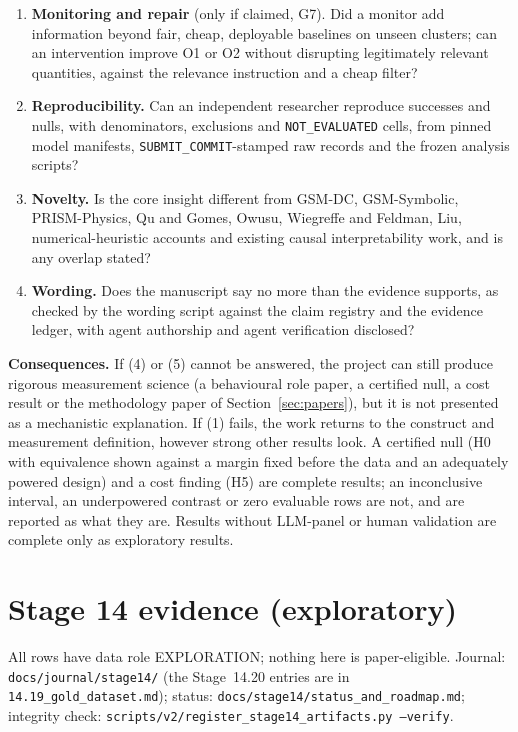 \documentclass[10pt,a4paper]{article}
\newcommand{\NE}{\texttt{NOT\_EVALUATED}}
\begin{document}
\begin{enumerate}
which models were uninformative because they fell outside the difficulty band?
\item \textbf{Monitoring and repair} (only if claimed, G7). Did a monitor add information beyond fair, cheap,
deployable baselines on unseen clusters; can an intervention improve O1 or O2 without disrupting legitimately
relevant quantities, against the relevance instruction and a cheap filter?
\item \textbf{Reproducibility.} Can an independent researcher reproduce successes and nulls, with denominators,
exclusions and \NE{} cells, from pinned model manifests, \texttt{SUBMIT\_COMMIT}-stamped raw records and the frozen
analysis scripts?
\item \textbf{Novelty.} Is the core insight different from GSM-DC, GSM-Symbolic, PRISM-Physics, Qu and Gomes,
Owusu, Wiegreffe and Feldman, Liu, numerical-heuristic accounts and existing causal interpretability work, and is
any overlap stated?
\item \textbf{Wording.} Does the manuscript say no more than the evidence supports, as checked by the wording
script against the claim registry and the evidence ledger, with agent authorship and agent verification
disclosed?
\end{enumerate}

\textbf{Consequences.} If (4) or (5) cannot be answered, the project can still produce rigorous measurement
science (a behavioural role paper, a certified null, a cost result or the methodology paper of
Section~\ref{sec:papers}), but it is not presented as a mechanistic explanation. If (1) fails, the work returns to
the construct and measurement definition, however strong other results look. A certified null (H0 with
equivalence shown against a margin fixed before the data and an adequately powered design) and a cost finding (H5)
are complete results; an inconclusive interval, an underpowered contrast or zero evaluable rows are not, and are
reported as what they are. Results without LLM-panel or human validation are complete only as exploratory results.

\appendix
\section{Stage 14 evidence (exploratory)}
\label{app:stage14}

All rows have data role EXPLORATION; nothing here is paper-eligible. Journal: \texttt{docs/journal/stage14/}
(the Stage~14.20 entries are in \texttt{14.19\_gold\_dataset.md}); status: \texttt{docs/stage14/status\_and\_roadmap.md};
integrity check: \texttt{scripts/v2/register\_stage14\_artifacts.py --verify}.
\end{document}
